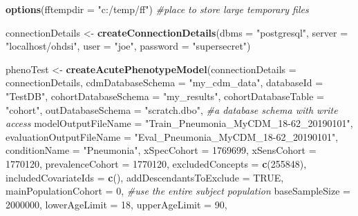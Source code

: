 \documentclass[
]{article}
\newenvironment{Shaded}{\begin{snugshade}}{\end{snugshade}}
\newcommand{\CommentTok}[1]{\textcolor[rgb]{0.56,0.35,0.01}{\textit{#1}}}
\newcommand{\DataTypeTok}[1]{\textcolor[rgb]{0.13,0.29,0.53}{#1}}
\newcommand{\DecValTok}[1]{\textcolor[rgb]{0.00,0.00,0.81}{#1}}
\newcommand{\KeywordTok}[1]{\textcolor[rgb]{0.13,0.29,0.53}{\textbf{#1}}}
\newcommand{\NormalTok}[1]{#1}
\newcommand{\OtherTok}[1]{\textcolor[rgb]{0.56,0.35,0.01}{#1}}
\newcommand{\StringTok}[1]{\textcolor[rgb]{0.31,0.60,0.02}{#1}}
\begin{document}
\begin{Shaded}
\begin{Highlighting}[]
\KeywordTok{options}\NormalTok{(}\DataTypeTok{fftempdir =} \StringTok{"c:/temp/ff"}\NormalTok{) }\CommentTok{#place to store large temporary files}

\NormalTok{connectionDetails <-}\StringTok{ }\KeywordTok{createConnectionDetails}\NormalTok{(}\DataTypeTok{dbms =} \StringTok{"postgresql"}\NormalTok{,}
                                              \DataTypeTok{server =} \StringTok{"localhost/ohdsi"}\NormalTok{,}
                                              \DataTypeTok{user =} \StringTok{"joe"}\NormalTok{,}
                                              \DataTypeTok{password =} \StringTok{"supersecret"}\NormalTok{)}

\NormalTok{phenoTest <-}\StringTok{ }\KeywordTok{createAcutePhenotypeModel}\NormalTok{(}\DataTypeTok{connectionDetails =}\NormalTok{ connectionDetails,}
                \DataTypeTok{cdmDatabaseSchema =} \StringTok{"my_cdm_data"}\NormalTok{,}
                \DataTypeTok{databaseId =} \StringTok{"TestDB"}\NormalTok{,}
                \DataTypeTok{cohortDatabaseSchema =} \StringTok{"my_results"}\NormalTok{,}
                \DataTypeTok{cohortDatabaseTable =} \StringTok{"cohort"}\NormalTok{,}
                \DataTypeTok{outDatabaseSchema =} \StringTok{"scratch.dbo"}\NormalTok{, }\CommentTok{#a database schema with write access}
                \DataTypeTok{modelOutputFileName =} \StringTok{"Train_Pneumonia_MyCDM_18-62_20190101"}\NormalTok{,}
                \DataTypeTok{evaluationOutputFileName =} \StringTok{"Eval_Pneumonia_MyCDM_18-62_20190101"}\NormalTok{,}
                \DataTypeTok{conditionName =} \StringTok{"Pneumonia"}\NormalTok{,}
                \DataTypeTok{xSpecCohort =} \DecValTok{1769699}\NormalTok{,}
                \DataTypeTok{xSensCohort =} \DecValTok{1770120}\NormalTok{,}
                \DataTypeTok{prevalenceCohort =} \DecValTok{1770120}\NormalTok{,}
                \DataTypeTok{excludedConcepts =} \KeywordTok{c}\NormalTok{(}\DecValTok{255848}\NormalTok{), }
                \DataTypeTok{includedCovariateIds =} \KeywordTok{c}\NormalTok{(),}
                \DataTypeTok{addDescendantsToExclude =} \OtherTok{TRUE}\NormalTok{,}
                \DataTypeTok{mainPopulationCohort =} \DecValTok{0}\NormalTok{, }\CommentTok{#use the entire subject population}
                \DataTypeTok{baseSampleSize =} \DecValTok{2000000}\NormalTok{,}
                \DataTypeTok{lowerAgeLimit =} \DecValTok{18}\NormalTok{, }
                \DataTypeTok{upperAgeLimit =} \DecValTok{90}\NormalTok{,}

\end{Highlighting}
\end{Shaded}
\end{document}
